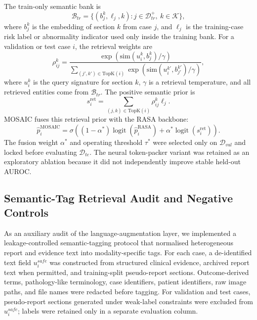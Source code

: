 \documentclass[11pt, a4paper]{article}
\theoremstyle{plain}
\theoremstyle{definition}
\begin{document}
The train-only semantic bank is
\begin{equation}
\mathcal{B}_{tr}
=
\{(b_j^k,\ell_j,k): j\in\mathcal{D}_{tr}^{+},\ k\in\mathcal{K}\},
\end{equation}
where \(b_j^k\) is the embedding of section \(k\) from case \(j\), and \(\ell_j\) is the training-case risk label or abnormality indicator used only inside the training bank. For a validation or test case \(i\), the retrieval weights are
\begin{equation}
\rho_{ij}^{k}
=
\frac{\exp(\mathrm{sim}(u_i^k,b_j^k)/\gamma)}
{\sum_{(j',k')\in\mathrm{TopK}(i)}\exp(\mathrm{sim}(u_i^{k'},b_{j'}^{k'})/\gamma)},
\end{equation}
where \(u_i^k\) is the query signature for section \(k\), \(\gamma\) is a retrieval temperature, and all retrieved entities come from \(\mathcal{B}_{tr}\). The positive semantic prior is
\begin{equation}
s_i^{\mathrm{ret}}
=
\sum_{(j,k)\in\mathrm{TopK}(i)}
\rho_{ij}^{k}\ell_j.
\end{equation}
MOSAIC fuses this retrieval prior with the RASA backbone:
\begin{equation}
\hat{p}_i^{\mathrm{MOSAIC}}
=
\sigma\left((1-\alpha^*)\operatorname{logit}(\hat{p}_i^{\mathrm{RASA}})
+ \alpha^*\operatorname{logit}(s_i^{\mathrm{ret}})\right).
\end{equation}
The fusion weight \(\alpha^*\) and operating threshold \(\tau^*\) were selected only on \(\mathcal{D}_{val}\) and locked before evaluating \(\mathcal{D}_{te}\). The neural token-packer variant was retained as an exploratory ablation because it did not independently improve stable held-out AUROC.

\subsection{Semantic-Tag Retrieval Audit and Negative Controls}
\label{subsec:methods_llm_tag_audit}

As an auxiliary audit of the language-augmentation layer, we implemented a leakage-controlled semantic-tagging protocol that normalised heterogeneous report and evidence text into modality-specific tags. For each case, a de-identified text field \(u_i^{safe}\) was constructed from structured clinical evidence, archived report text when permitted, and training-split pseudo-report sections. Outcome-derived terms, pathology-like terminology, case identifiers, patient identifiers, raw image paths, and file names were redacted before tagging. For validation and test cases, pseudo-report sections generated under weak-label constraints were excluded from \(u_i^{safe}\); labels were retained only in a separate evaluation column.
\end{document}
